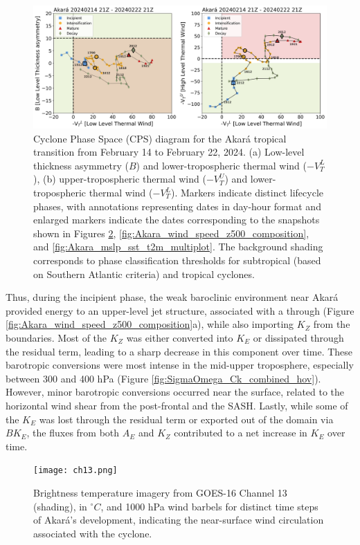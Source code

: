 \documentclass[pdflatex,sn-chicago]{sn-jnl}%
\theoremstyle{plain}
\theoremstyle{definition}
\theoremstyle{remark}
\theoremstyle{definition}
\begin{document}
\begin{figure}[h!]
\centering
\includegraphics[width=\textwidth]{cps_datas_danilo.png}
\caption{Cyclone Phase Space (CPS) diagram for the Akará tropical transition from February 14 to February 22, 2024. (a) Low-level thickness asymmetry (\(B\)) and lower-tropospheric thermal wind (\(-V_T^L\)), (b) upper-tropospheric thermal wind (\(-V_T^U\)) and lower-tropospheric thermal wind (\(-V_T^L\)). Markers indicate distinct lifecycle phases, with annotations representing dates in day-hour format and enlarged markers indicate the dates corresponding to the snapshots shown in Figures \ref{fig:ch13}, \ref{fig:Akara_wind_speed_z500_composition}, and \ref{fig:Akara_mslp_sst_t2m_multiplot}. The background shading corresponds to phase classification thresholds for subtropical (based on Southern Atlantic criteria) and tropical cyclones.}
\label{fig:cps}
\end{figure}

Thus, during the incipient phase, the weak baroclinic environment near Akará provided energy to an upper-level jet structure, associated with a through (Figure \ref{fig:Akara_wind_speed_z500_composition}a), while also importing $K_Z$ from the boundaries. Most of the $K_Z$ was either converted into $K_E$ or dissipated through the residual term, leading to a sharp decrease in this component over time. These barotropic conversions were most intense in the mid-upper troposphere, especially between 300 and 400 hPa (Figure \ref{fig:SigmaOmega_Ck_combined_hov}). However, minor barotropic conversions occurred near the surface, related to the horizontal wind shear from the post-frontal and the SASH. Lastly, while some of the $K_E$ was lost through the residual term or exported out of the domain via $BK_E$, the fluxes from both $A_E$ and $K_Z$ contributed to a net increase in $K_E$ over time.

\begin{figure}[h!]
\centering
\texttt{[image: ch13.png]}
\caption{Brightness temperature imagery from GOES-16 Channel 13 (shading), in $^{\circ}C$, and 1000 hPa wind barbels for distinct time steps of Akará's development, indicating the near-surface wind circulation associated with the cyclone.}
\label{fig:ch13}
\end{figure}
\end{document}
